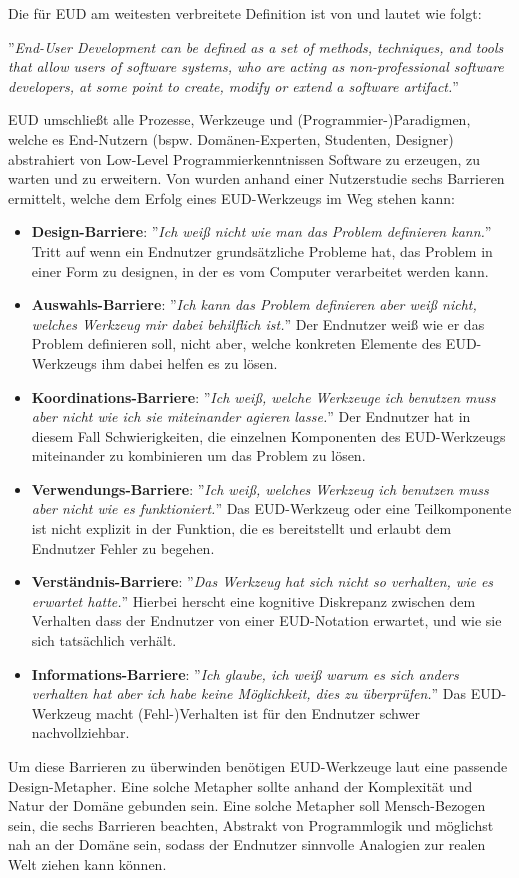 Die für \ac{EUD} am weitesten verbreitete Definition ist von \cite{Lieberman.2006} und lautet wie folgt:

''\textit{End-User Development can be defined as a set of methods, techniques, and tools that allow users of software systems, who are acting as non-professional software developers, at some point to create, modify or extend a software artifact.}''

\ac{EUD} umschließt alle Prozesse, Werkzeuge und (Programmier-)Paradigmen, welche es End-Nutzern (bspw. Domänen-Experten, Studenten, Designer) abstrahiert von Low-Level Programmierkenntnissen Software zu erzeugen, zu warten und zu erweitern. Von \cite{ko2004six} wurden anhand einer Nutzerstudie sechs Barrieren ermittelt, welche dem Erfolg eines \ac{EUD}-Werkzeugs im Weg stehen kann:
\begin{itemize}
    \item \textbf{Design-Barriere}: ''\textit{Ich weiß nicht wie man das Problem definieren kann.}'' Tritt auf wenn ein Endnutzer grundsätzliche Probleme hat, das Problem in einer Form zu designen, in der es vom Computer verarbeitet werden kann.
    \item \textbf{Auswahls-Barriere}: ''\textit{Ich kann das Problem definieren aber weiß nicht, welches Werkzeug mir dabei behilflich ist.}'' Der Endnutzer weiß wie er das Problem definieren soll, nicht aber, welche konkreten Elemente des \ac{EUD}-Werkzeugs ihm dabei helfen es zu lösen.
    \item \textbf{Koordinations-Barriere}: ''\textit{Ich weiß, welche Werkzeuge ich benutzen muss aber nicht wie ich sie miteinander agieren lasse.}'' Der Endnutzer hat in diesem Fall Schwierigkeiten, die einzelnen Komponenten des \ac{EUD}-Werkzeugs miteinander zu kombinieren um das Problem zu lösen. 
    \item \textbf{Verwendungs-Barriere}: ''\textit{Ich weiß, welches Werkzeug ich benutzen muss aber nicht wie es funktioniert.}'' Das \ac{EUD}-Werkzeug oder eine Teilkomponente ist nicht explizit in der Funktion, die es bereitstellt und erlaubt dem Endnutzer Fehler zu begehen. 
    \item \textbf{Verständnis-Barriere}: ''\textit{Das Werkzeug hat sich nicht so verhalten, wie es erwartet hatte.}'' Hierbei herscht eine kognitive Diskrepanz zwischen dem Verhalten dass der Endnutzer von einer \ac{EUD}-Notation erwartet, und wie sie sich tatsächlich verhält.
    \item \textbf{Informations-Barriere}: ''\textit{Ich glaube, ich weiß warum es sich anders verhalten hat aber ich habe keine Möglichkeit, dies zu überprüfen.}''  Das \ac{EUD}-Werkzeug macht (Fehl-)Verhalten ist für den Endnutzer schwer nachvollziehbar.
\end{itemize}
Um diese Barrieren zu überwinden benötigen \ac{EUD}-Werkzeuge laut \cite{ko2004six} eine passende Design-Metapher. Eine solche Metapher sollte anhand der Komplexität und Natur der Domäne gebunden sein. Eine solche Metapher soll Mensch-Bezogen sein, die sechs Barrieren beachten, Abstrakt von Programmlogik und möglichst nah an der Domäne sein, sodass der Endnutzer sinnvolle Analogien zur realen Welt ziehen kann können. 

